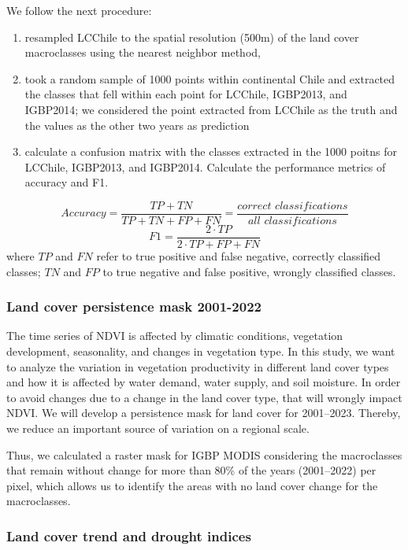 \documentclass[
  number,
  preprint,
  3p,
  onecolumn]{elsarticle}
\providecommand{\tightlist}{%
  \setlength{\itemsep}{0pt}\setlength{\parskip}{0pt}}\usepackage{longtable,booktabs,array}
\begin{document}
We follow the next procedure:

\begin{enumerate}
\def\labelenumi{\roman{enumi})}
\tightlist
\item
  resampled LCChile to the spatial resolution (500m) of the land cover
  macroclasses using the nearest neighbor method,
\item
  took a random sample of 1000 points within continental Chile and
  extracted the classes that fell within each point for LCChile,
  IGBP2013, and IGBP2014; we considered the point extracted from LCChile
  as the truth and the values as the other two years as prediction
\item
  calculate a confusion matrix with the classes extracted in the 1000
  poitns for LCChile, IGBP2013, and IGBP2014. Calculate the performance
  metrics of accuracy and F1.
\end{enumerate}

\[Accuracy = \frac{TP+TN}{TP+TN+FP+FN}=\frac{correct\,\, classifications}{all\,\, classifications}\]
\[F1=\frac{2\cdot TP}{2\cdot TP + FP +FN}\] where \(TP\) and \(FN\)
refer to true positive and false negative, correctly classified classes;
\(TN\) and \(FP\) to true negative and false positive, wrongly
classified classes.

\hypertarget{land-cover-persistence-mask-2001-2022}{%
\subsubsection{Land cover persistence mask
2001-2022}\label{land-cover-persistence-mask-2001-2022}}

The time series of NDVI is affected by climatic conditions, vegetation
development, seasonality, and changes in vegetation type. In this study,
we want to analyze the variation in vegetation productivity in different
land cover types and how it is affected by water demand, water supply,
and soil moisture. In order to avoid changes due to a change in the land
cover type, that will wrongly impact NDVI. We will develop a persistence
mask for land cover for 2001--2023. Thereby, we reduce an important
source of variation on a regional scale.

Thus, we calculated a raster mask for IGBP MODIS considering the
macroclasses that remain without change for more than 80\% of the years
(2001--2022) per pixel, which allows us to identify the areas with no
land cover change for the macroclasses.

\hypertarget{land-cover-trend-and-drought-indices}{%
\subsubsection{Land cover trend and drought
indices}\label{land-cover-trend-and-drought-indices}}
\end{document}
